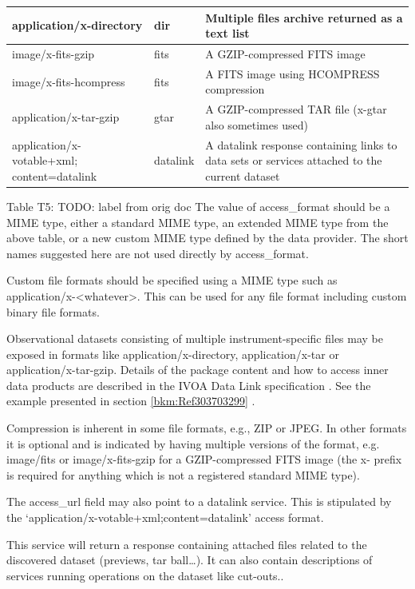 \documentclass[11pt,a4paper]{ivoa}
\begin{document}
\begin{tabular}{|p{}|p{}|p{}|}
application/x-directory & dir & Multiple files archive returned as a text list \\\hline
image/x-fits-gzip & fits & A GZIP-compressed FITS image\\\hline
image/x-fits-hcompress & fits & A FITS image using HCOMPRESS compression\\\hline
application/x-tar-gzip & gtar & A GZIP-compressed TAR file (x-gtar also sometimes used)\\\hline
application/x-votable+xml; content=datalink & datalink & A datalink response containing links to  data sets or services attached to the current dataset\\\hline
\end{tabular}
\label{tab:5}Table T5: TODO: label from orig doc
The value of access\_format should be a MIME type, either a standard MIME type, an extended MIME type from the above
table, or a new custom MIME type defined by the data provider.  The short names suggested here are not used directly by
access\_format.

Custom file formats should be specified using a MIME type such as
{\textquotedbl}application/x-{\textless}whatever{\textgreater}{\textquotedbl}.  This can be used for any file format
including custom binary file formats.

Observational datasets consisting of multiple instrument-specific files may be exposed in formats like
application/x-directory, application/x-tar or application/x-tar-gzip.  Details of the package content and how to access
inner data products are described in the IVOA Data Link specification \citep{2015ivoa.spec.0617D}. See the example
presented in section \ref{bkm:Ref303703299} .

Compression is inherent in some file formats, e.g., ZIP or JPEG.  In other formats it is optional and is indicated by
having multiple versions of the format, e.g. image/fits or image/x-fits-gzip for a GZIP-compressed FITS image (the
{\textquotedbl}x-{\textquotedbl} prefix is required for anything which is not a registered standard MIME type).

The access\_url field may also point to a datalink service. This is stipulated by the
`application/x-votable+xml;content=datalink' access format. 

This service will return a response containing attached files related to the discovered dataset (previews, tar
ball{\dots}).  It can also contain descriptions of services running operations on the dataset like cut-outs..
\end{document}
